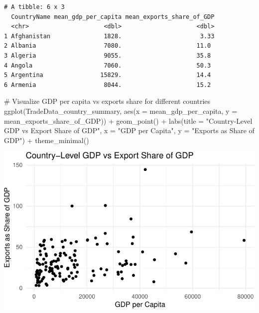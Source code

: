 \documentclass[
  10pt,
]{article}
\newenvironment{Shaded}{\begin{snugshade}}{\end{snugshade}}
\newcommand{\AttributeTok}[1]{\textcolor[rgb]{0.40,0.45,0.13}{#1}}
\newcommand{\CommentTok}[1]{\textcolor[rgb]{0.37,0.37,0.37}{#1}}
\newcommand{\FunctionTok}[1]{\textcolor[rgb]{0.28,0.35,0.67}{#1}}
\newcommand{\NormalTok}[1]{\textcolor[rgb]{0.00,0.23,0.31}{#1}}
\newcommand{\SpecialCharTok}[1]{\textcolor[rgb]{0.37,0.37,0.37}{#1}}
\newcommand{\StringTok}[1]{\textcolor[rgb]{0.13,0.47,0.30}{#1}}
\begin{document}
\begin{verbatim}
# A tibble: 6 x 3
  CountryName mean_gdp_per_capita mean_exports_share_of_GDP
  <chr>                     <dbl>                     <dbl>
1 Afghanistan               1828.                      3.33
2 Albania                   7080.                     11.0 
3 Algeria                   9055.                     35.8 
4 Angola                    7060.                     50.3 
5 Argentina                15829.                     14.4 
6 Armenia                   8044.                     15.2 
\end{verbatim}

\begin{Shaded}
\begin{Highlighting}[]
\CommentTok{\# Visualize GDP per capita vs exports share for different countries}
\FunctionTok{ggplot}\NormalTok{(TradeData\_country\_summary, }\FunctionTok{aes}\NormalTok{(}\AttributeTok{x =}\NormalTok{ mean\_gdp\_per\_capita, }\AttributeTok{y =}\NormalTok{ mean\_exports\_share\_of\_GDP)) }\SpecialCharTok{+}
  \FunctionTok{geom\_point}\NormalTok{() }\SpecialCharTok{+}
  \FunctionTok{labs}\NormalTok{(}\AttributeTok{title =} \StringTok{"Country{-}Level GDP vs Export Share of GDP"}\NormalTok{, }
       \AttributeTok{x =} \StringTok{"GDP per Capita"}\NormalTok{, }
       \AttributeTok{y =} \StringTok{"Exports as Share of GDP"}\NormalTok{) }\SpecialCharTok{+}
  \FunctionTok{theme\_minimal}\NormalTok{()}
\end{Highlighting}
\end{Shaded}

\includegraphics{draft_1_files/figure-pdf/unnamed-chunk-23-1.pdf}

\begin{Shaded}
\end{Shaded}
\end{document}
